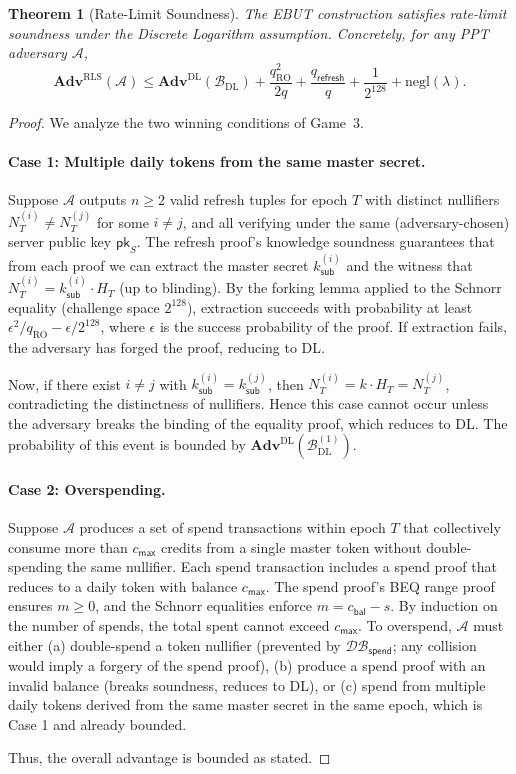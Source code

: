 \documentclass[11pt]{article}
\theoremstyle{definitionstyle}
\newtheorem{theorem}{Theorem}[section]
\theoremstyle{plain}
\newcommand{\advantage}[1]{\mathbf{Adv}^{\mathrm{#1}}}
\newcommand{\negl}{\mathrm{negl}}
\newcommand{\DB}{\mathcal{DB}}
\begin{document}
\begin{theorem}[Rate-Limit Soundness]
The EBUT construction satisfies rate-limit soundness under the Discrete Logarithm assumption. Concretely, for any PPT adversary $\mathcal{A}$,
\[
\advantage{RLS}(\mathcal{A}) \le \advantage{DL}(\mathcal{B}_{\text{DL}}) + \frac{q_{\text{RO}}^2}{2q} + \frac{q_{\mathsf{refresh}}}{q} + \frac{1}{2^{128}} + \negl(\lambda).
\]
\end{theorem}
\begin{proof}
We analyze the two winning conditions of Game~3.

\paragraph{Case 1: Multiple daily tokens from the same master secret.}
Suppose $\mathcal{A}$ outputs $n \ge 2$ valid refresh tuples for epoch $T$ with distinct nullifiers $N_T^{(i)} \neq N_T^{(j)}$ for some $i \neq j$, and all verifying under the same (adversary-chosen) server public key $\mathsf{pk}_S$. The refresh proof's knowledge soundness guarantees that from each proof we can extract the master secret $k_{\mathsf{sub}}^{(i)}$ and the witness that $N_T^{(i)} = k_{\mathsf{sub}}^{(i)} \cdot H_T$ (up to blinding). By the forking lemma applied to the Schnorr equality (challenge space $2^{128}$), extraction succeeds with probability at least $\epsilon^2/q_{\text{RO}} - \epsilon/2^{128}$, where $\epsilon$ is the success probability of the proof. If extraction fails, the adversary has forged the proof, reducing to DL.

Now, if there exist $i \neq j$ with $k_{\mathsf{sub}}^{(i)} = k_{\mathsf{sub}}^{(j)}$, then $N_T^{(i)} = k \cdot H_T = N_T^{(j)}$, contradicting the distinctness of nullifiers. Hence this case cannot occur unless the adversary breaks the binding of the equality proof, which reduces to DL. The probability of this event is bounded by $\advantage{DL}(\mathcal{B}_{\text{DL}}^{(1)})$.

\paragraph{Case 2: Overspending.}
Suppose $\mathcal{A}$ produces a set of spend transactions within epoch $T$ that collectively consume more than $c_{\mathsf{max}}$ credits from a single master token without double-spending the same nullifier. Each spend transaction includes a spend proof that reduces to a daily token with balance $c_{\mathsf{max}}$. The spend proof's BEQ range proof ensures $m \ge 0$, and the Schnorr equalities enforce $m = c_{\mathsf{bal}} - s$. By induction on the number of spends, the total spent cannot exceed $c_{\mathsf{max}}$. To overspend, $\mathcal{A}$ must either (a) double-spend a token nullifier (prevented by $\DB_{\mathsf{spend}}$; any collision would imply a forgery of the spend proof), (b) produce a spend proof with an invalid balance (breaks soundness, reduces to DL), or (c) spend from multiple daily tokens derived from the same master secret in the same epoch, which is Case 1 and already bounded.

Thus, the overall advantage is bounded as stated.
\end{proof}
\end{document}
